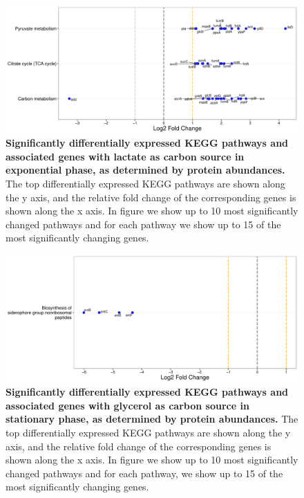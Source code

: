 \documentclass[a4paper]{article}
\begin{document}
\clearpage
\begin{figure}
	\includegraphics[width=1.0\textwidth]{../../d_figures/kegg_05.pdf}
	\caption[Significantly altered KEGG pathways for protein samples in exponential phase tested for lactate against glucose]
	{\textbf{Significantly differentially expressed KEGG pathways and associated genes with lactate as carbon source in exponential phase, as determined by protein abundances.} The top differentially expressed KEGG pathways are shown along the y axis, and the relative fold change of the corresponding genes is shown along the x axis. In figure we show up to 10 most significantly changed pathways and for each pathway we show up to 15 of the most significantly changing genes.}
\end{figure}

\clearpage
\begin{figure}
	\includegraphics[width=1.0\textwidth]{../../d_figures/kegg_06.pdf}
	\caption[Significantly altered KEGG pathways for protein samples in stationary phase tested for glycerol against glucose]
	{\textbf{Significantly differentially expressed KEGG pathways and associated genes with glycerol as carbon source in stationary phase, as determined by protein abundances.} The top differentially expressed KEGG pathways are shown along the y axis, and the relative fold change of the corresponding genes is shown along the x axis. In figure we show up to 10 most significantly changed pathways and for each pathway, we show up to 15 of the most significantly changing genes.}
\end{figure}
\end{document}
